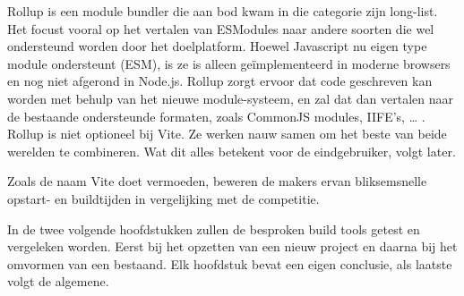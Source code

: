 Rollup is een module bundler die aan bod kwam in die categorie zijn long-list. Het focust vooral op het vertalen van ESModules naar andere soorten die wel ondersteund worden door het doelplatform. Hoewel Javascript nu eigen type module ondersteunt (ESM), is ze is alleen geïmplementeerd in moderne browsers en nog niet afgerond in Node.js. Rollup zorgt ervoor dat code geschreven kan worden met behulp van het nieuwe module-systeem, en zal dat dan vertalen naar de bestaande ondersteunde formaten, zoals CommonJS modules, IIFE’s, … . Rollup is niet optioneel bij Vite. Ze werken nauw samen om het beste van beide werelden te combineren. Wat dit alles betekent voor de eindgebruiker, volgt later.

Zoals de naam Vite doet vermoeden, beweren de makers ervan bliksemsnelle opstart- en buildtijden in vergelijking met de competitie.


In de twee volgende hoofdstukken zullen de besproken build tools getest en vergeleken worden. Eerst bij het opzetten van een nieuw project en daarna bij het omvormen van een bestaand. Elk hoofdstuk bevat een eigen conclusie, als laatste volgt de algemene.


